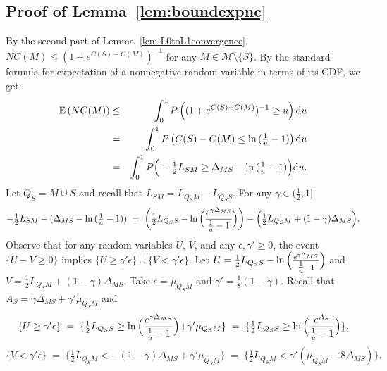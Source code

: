 \documentclass[aos]{imsart}
\theoremstyle{plain}
\newcommand{\E}{\mathbb{E}}
\begin{document}
\begin{supplement}
\subsection{Proof of Lemma~\ref{lem:boundexpnc}}


By the second part of Lemma~\ref{lem:L0toL1convergence},  $NC(M)\leq (1+e^{C(S)-C(M)})^{-1}$ for any $M\in \mathcal M\setminus \{S\}$.    By the standard formula for expectation of a nonnegative random variable in terms of its CDF, we get:
\begin{eqnarray*}
  \E\left(NC(M)\right)  &\leq& \int_0^1 P\left((1+e^{C(S)-C(M)})^{-1}\geq u\right){\rm d} u\\
  &=&\int_0^1 P\left(C(S)-C(M) \leq \ln{(\tfrac1u-1)}\right){\rm d}u\\
  &=&\int_0^1 P\Big(-\tfrac12 L_{SM} \geq \Delta_{MS}-\ln{(\tfrac1u-1)}\Big) {\rm d}u.
\end{eqnarray*}
Let $Q_S=M \cup S$ and recall that $L_{SM}=L_{Q_SM}-L_{Q_SS}$. For any $\gamma\in (\frac{1}{2},1]$
$$
-\tfrac12 L_{SM} -(\Delta_{MS}-\ln{(\tfrac1u-1)})\;=\;\left(\tfrac12 L_{Q_SS}-\ln{\Bigl(\frac{e^{\gamma\Delta_{MS}}}{\tfrac1u-1}\Bigl)}\right)-\Bigl(\tfrac12 L_{Q_SM}+(1-\gamma)\Delta_{MS}\Bigl).
$$
Observe that for any random variables $U$, $V$, and any $\epsilon,\gamma' \geq 0$, the event $
\{U-V \geq 0\}$ implies $\{U \geq \gamma' \epsilon\}\cup
\{V  < \gamma' \epsilon\}$. Let $U=\tfrac12 L_{Q_SS}-\ln{\Bigl(\frac{e^{\gamma\Delta_{MS}}}{\tfrac1u-1}\Bigl)}$ and $V=\tfrac12 L_{Q_SM}+(1-\gamma)\Delta_{MS}$. Take $\epsilon=\mu_{Q_SM}$ and $\gamma'=\tfrac18({1-\gamma})$. Recall that $A_S=\gamma\Delta_{MS}+\gamma'\mu_{Q_SM}$ and
$$
\{U\geq \gamma'\epsilon\}\;=\;\{\tfrac12 L_{Q_SS}\geq \ln{\Bigl(\frac{e^{\gamma\Delta_{MS}}}{\tfrac1u-1}}\Bigl)+\gamma'\mu_{Q_SM}\}\;=\;\{\tfrac12 L_{Q_SS}\geq \ln{\Bigl(\frac{e^{A_S}}{\tfrac1u-1}}\Bigl)\},
$$
$$
\{V<\gamma'\epsilon\}\;=\;\{\tfrac12 L_{Q_SM}<-(1-\gamma)\Delta_{MS}+\gamma'\mu_{Q_SM}\}\;=\;\{\tfrac12 L_{Q_SM}<\gamma'(\mu_{Q_SM}-8\Delta_{MS})\}.
$$
\end{supplement}
\end{document}
